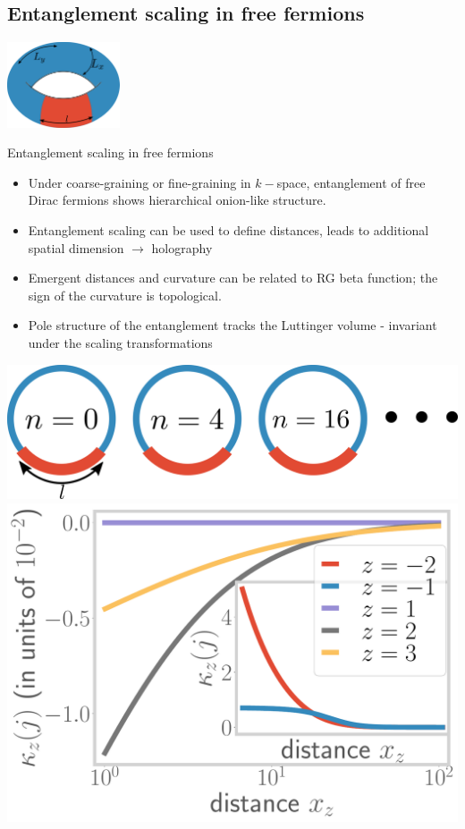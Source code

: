 \documentclass[11pt,aspectratio=169]{beamer}
\begin{document}
\begin{frame}{}
\section{Entanglement scaling in free fermions}

\includegraphics[width=0.25\textwidth]{figures/subsystem-torus.pdf}
\end{frame}

\begin{frame}{Entanglement scaling in free fermions}
\hspace*{-40pt}
\begin{minipage}{0.65\textwidth}
\begin{itemize}
	\item Under coarse-graining or fine-graining in \(k-\)space, entanglement of free Dirac fermions shows hierarchical onion-like structure.
	\item Entanglement scaling can be used to define distances, leads to additional spatial dimension \(\longrightarrow\) holography
	\item Emergent distances and curvature can be related to RG beta function; the sign of the curvature is topological.
	\item Pole structure of the entanglement tracks the Luttinger volume - invariant under the scaling transformations
\end{itemize}
\end{minipage}
\hspace*{5pt}
\begin{minipage}{0.41\textwidth}
\includegraphics[width=\textwidth]{figures/A_mi.pdf}
\includegraphics[width=\textwidth]{curvature-pos.pdf}

\end{minipage}
\end{frame}
\end{document}
